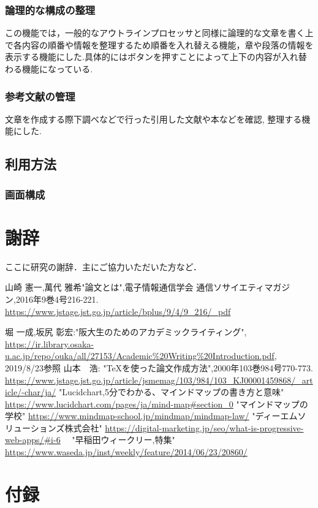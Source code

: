 \documentclass[a4j,12pt]{jarticle}
\begin{document}
\subsubsection{論理的な構成の整理}
この機能では，一般的なアウトラインプロセッサと同様に論理的な文章を書く上で各内容の順番や情報を整理するため順番を入れ替える機能，章や段落の情報を表示する機能にした.具体的にはボタンを押すことによって上下の内容が入れ替わる機能になっている.

\subsubsection{参考文献の管理}
文章を作成する際下調べなどで行った引用した文献や本などを確認, 整理する機能にした.

\newpage

\subsection{利用方法}
\subsubsection{画面構成}

\newpage

\section*{謝辞}

ここに研究の謝辞．主にご協力いただいた方など．

\newpage
{}
 \begin{thebibliography}{99}
山崎 憲一,萬代 雅希"論文とは",電子情報通信学会 通信ソサイエティマガジン,2016年9巻4号216-221.
\url{https://www.jstage.jst.go.jp/article/bplus/9/4/9_216/_pdf}

 堀 一成,坂尻 彰宏:"阪大生のためのアカデミックライティング",
\url{https://ir.library.osaka-u.ac.jp/repo/ouka/all/27153/Academic%20Writing%20Introduction.pdf}, 2019/8/23参照
 山本　浩: "TeXを使った論文作成方法",2000年103巻984号770-773.
\url{https://www.jstage.jst.go.jp/article/jsmemag/103/984/103_KJ00001459868/_article/-char/ja/}
 "Lucidchart,5分でわかる、マインドマップの書き方と意味"
\url{https://www.lucidchart.com/pages/ja/mind-map#section_0}
 "マインドマップの学校"
\url{https://www.mindmap-school.jp/mindmap/mindmap-law/}
 "ディーエムソリューションズ株式会社"
\url{https://digital-marketing.jp/seo/what-is-progressive-web-apps/#i-6}
　"早稲田ウィークリー,特集"
\url{https://www.waseda.jp/inst/weekly/feature/2014/06/23/20860/}
\end{thebibliography}
\section*{付録}

\end{document}
